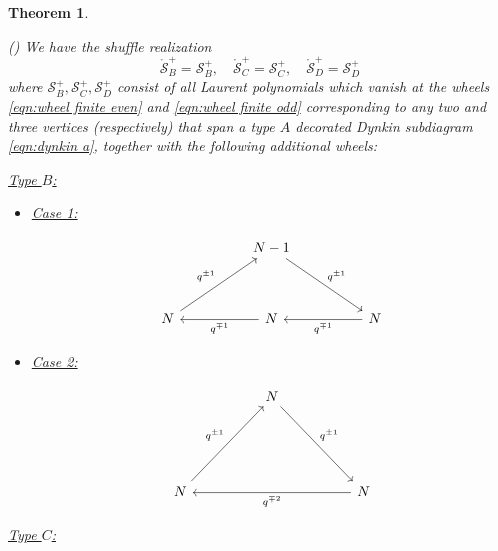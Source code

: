 \documentclass{amsart}
\newtheorem{theorem}[subsection]{Theorem}
\def\CS{{\mathcal{S}}}
\def\oCS{\mathring{\CS}}
\begin{document}
\medskip 

\begin{theorem}
\label{thm:b,c,d 2}

(\cite[Theorems 1.1-1.3]{NT}) We have the shuffle realization
\[
\oCS^+_B = \CS^+_B, \quad \oCS^+_C = \CS^+_C, \quad \oCS^+_D = \CS^+_D
\]
where $\CS^+_B, \CS^+_C, \CS^+_D$ consist of all Laurent polynomials which vanish at the wheels \eqref{eqn:wheel finite even} and \eqref{eqn:wheel finite odd} corresponding to any two and three vertices (respectively) that span a type $A$ decorated Dynkin subdiagram \eqref{eqn:dynkin a}, together with the following additional wheels:

\medskip 

\noindent \underline{Type $B$:} 

\medskip 

\begin{itemize}[leftmargin=*]

\item \underline{Case 1:} 

\begin{equation}
\label{eqn:wheel b 1}
\begin{tikzcd}
&& N-1  && \\ \\ 
N && N && N
\arrow["{q^{\pm 1}}"', swap, from=3-1, to=1-3]
\arrow["{q^{\mp 1}}"', swap, from=3-3, to=3-1]
\arrow["{q^{\mp 1}}"', swap, from=3-5, to=3-3]
\arrow["{q^{\pm 1}}"', swap, from=1-3, to=3-5]
\end{tikzcd}
\end{equation}

\medskip 

\item \underline{Case 2:} 

\begin{equation}
\label{eqn:wheel b 2}
\begin{tikzcd}
&& N \\ \\ \\
N &&&& N
\arrow["q^{\pm 1}"', swap, from=4-1, to=1-3]
\arrow["{q^{\mp 2}}"', swap, from=4-5, to=4-1]
\arrow["q^{\pm 1}"', swap, from=1-3, to=4-5]
\end{tikzcd}
\end{equation}

\end{itemize} 

\medskip 

\noindent \underline{Type $C$:} 


\end{theorem}
\end{document}
